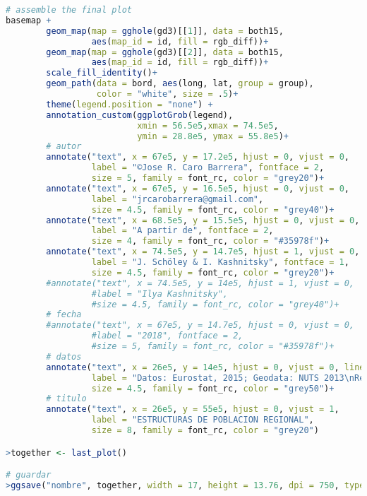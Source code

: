 \begin{lstlisting}[language=R, caption=C\'odigo 2 con la construcci\'on del mapa]
# assemble the final plot
basemap +
        geom_map(map = gghole(gd3)[[1]], data = both15,
                 aes(map_id = id, fill = rgb_diff))+
        geom_map(map = gghole(gd3)[[2]], data = both15,
                 aes(map_id = id, fill = rgb_diff))+
        scale_fill_identity()+
        geom_path(data = bord, aes(long, lat, group = group), 
                  color = "white", size = .5)+
        theme(legend.position = "none") + 
        annotation_custom(ggplotGrob(legend),
                          xmin = 56.5e5,xmax = 74.5e5, 
                          ymin = 28.8e5, ymax = 55.8e5)+
        # autor
        annotate("text", x = 67e5, y = 17.2e5, hjust = 0, vjust = 0,
                 label = "©Jose R. Caro Barrera", fontface = 2,
                 size = 5, family = font_rc, color = "grey20")+
        annotate("text", x = 67e5, y = 16.5e5, hjust = 0, vjust = 0,
                 label = "jrcarobarrera@gmail.com",
                 size = 4.5, family = font_rc, color = "grey40")+
        annotate("text", x = 68.5e5, y = 15.5e5, hjust = 0, vjust = 0,
                 label = "A partir de", fontface = 2,
                 size = 4, family = font_rc, color = "#35978f")+
        annotate("text", x = 74.5e5, y = 14.7e5, hjust = 1, vjust = 0,
                 label = "J. Schöley & I. Kashnitsky", fontface = 1,
                 size = 4.5, family = font_rc, color = "grey20")+
        #annotate("text", x = 74.5e5, y = 14e5, hjust = 1, vjust = 0,
                 #label = "Ilya Kashnitsky",
                 #size = 4.5, family = font_rc, color = "grey40")+
        # fecha
        #annotate("text", x = 67e5, y = 14.7e5, hjust = 0, vjust = 0,
                 #label = "2018", fontface = 2,
                 #size = 5, family = font_rc, color = "#35978f")+
        # datos
        annotate("text", x = 26e5, y = 14e5, hjust = 0, vjust = 0, lineheight = .9,
                 label = "Datos: Eurostat, 2015; Geodata: NUTS 2013\nReproduce: https://github.com/ikashnitsky/the-lancet-2018",
                 size = 4.5, family = font_rc, color = "grey50")+
        # titulo
        annotate("text", x = 26e5, y = 55e5, hjust = 0, vjust = 1, 
                 label = "ESTRUCTURAS DE POBLACION REGIONAL",
                 size = 8, family = font_rc, color = "grey20")

>together <- last_plot()

# guardar
>ggsave("nombre", together, width = 17, height = 13.76, dpi = 750, type = "cairo-png")

\end{lstlisting}

